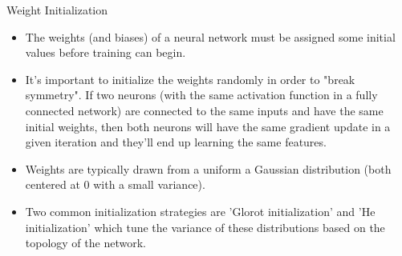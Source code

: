 \begin{vbframe}{Weight Initialization}
\begin{itemize}
\item The weights (and biases) of a neural network must be assigned some initial values before training can begin.
\item It’s important to initialize the weights randomly in order to "break symmetry". If two neurons (with the same activation function in a fully connected network) are connected to the same inputs and have the same initial weights, then both neurons will have the same gradient update in a given iteration and they’ll end up learning the same features.
\item Weights are typically drawn from a uniform a Gaussian distribution (both centered at 0 with a small variance).
\item Two common initialization strategies are ’Glorot initialization’ and ’He initialization’ which tune the variance of these distributions based on the topology of the network.
\end{itemize}
\end{vbframe}



